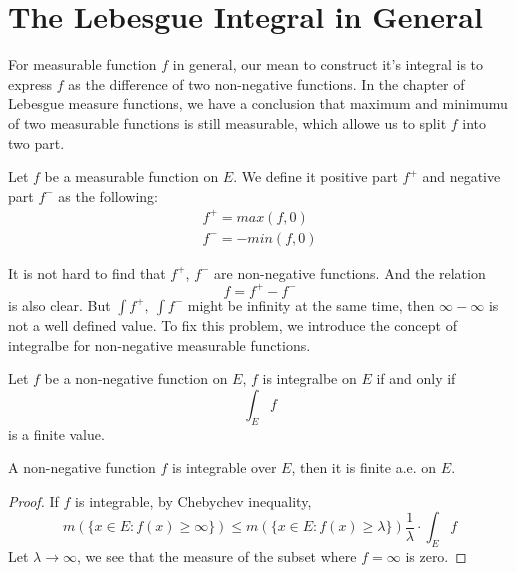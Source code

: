 \documentclass[lang=en, 12pt]{elegantbook}
\begin{document}
        \section{The Lebesgue Integral in General}
            For measurable function $f$ in general, our mean to construct it's integral is to express $f$ as the difference of
        two non-negative functions. In the chapter of Lebesgue measure functions, we have a conclusion that maximum and minimumu of two 
        measurable functions is still measurable, which allowe us to split $f$ into two part.
            \begin{definition}
                Let $f$ be a measurable function on $E$. We define it positive part $f^+$ and negative part $f^-$ as the following:
                \begin{equation*}
                    \begin{aligned}
                        f^+ = max(f, 0)\\
                        f^- = -min(f, 0) 
                    \end{aligned}
                \end{equation*} 
            \end{definition}
            It is not hard to find that $f^+$, $f^-$ are non-negative functions. And the relation 
            $$f = f^+ - f^-$$
        is also clear. But $\int f^+,  \ \int f^-$ might be infinity at the same time, then $\infty - \infty$ is not a well defined value. To fix this
        problem, we introduce the concept of integralbe for non-negative measurable functions.
            \begin{definition}[Integralbe]
                Let $f$ be a non-negative function on $E$, $f$ is integralbe on $E$ if and only if $$\int_E f$$
            is a finite value.
            \end{definition}
            \begin{proposition}\label{IntegralbeFiniteAE}
                A non-negative function $f$ is integrable over $E$, then it is finite a.e. on $E$.
            \end{proposition}
            \begin{proof}
                If $f$ is integrable, by Chebychev inequality,
                $$m(\{x \in E: f(x) \geq \infty\}) \leq m(\{x \in E: f(x) \geq \lambda\}) \frac{1}{\lambda} \cdot \int_E f$$
                Let $\lambda \to \infty$, we see that the measure of the subset where $f=\infty$ is zero.
            \end{proof}
\end{document}
